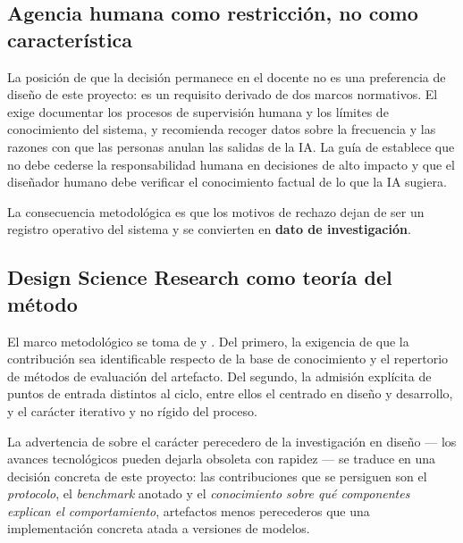 \subsection{Agencia humana como restricción, no como característica}
\label{sec:teo-agencia}

La posición de que la decisión permanece en el docente no es una preferencia de
diseño de este proyecto: es un requisito derivado de dos marcos normativos. El
\textcite{nist2023airmf} exige documentar los procesos de supervisión humana y los
límites de conocimiento del sistema, y recomienda recoger datos sobre la frecuencia y
las razones con que las personas anulan las salidas de la IA. La guía de
\textcite{miao2023guidance} establece que no debe cederse la responsabilidad humana
en decisiones de alto impacto y que el diseñador humano debe verificar el
conocimiento factual de lo que la IA sugiera.

La consecuencia metodológica es que los motivos de rechazo dejan de ser un registro
operativo del sistema y se convierten en \textbf{dato de investigación}.

\subsection{Design Science Research como teoría del método}
\label{sec:teo-dsr}

El marco metodológico se toma de \textcite{hevner2004design} y
\textcite{peffers2007design}. Del primero, la exigencia de que la contribución sea
identificable respecto de la base de conocimiento y el repertorio de métodos de
evaluación del artefacto. Del segundo, la admisión explícita de puntos de entrada
distintos al ciclo, entre ellos el centrado en diseño y desarrollo, y el carácter
iterativo y no rígido del proceso.

La advertencia de \textcite{hevner2004design} sobre el carácter perecedero de la
investigación en diseño --- los avances tecnológicos pueden dejarla obsoleta con
rapidez --- se traduce en una decisión concreta de este proyecto: las contribuciones
que se persiguen son el \emph{protocolo}, el \emph{benchmark} anotado y el
\emph{conocimiento sobre qué componentes explican el comportamiento}, artefactos
menos perecederos que una implementación concreta atada a versiones de modelos.
